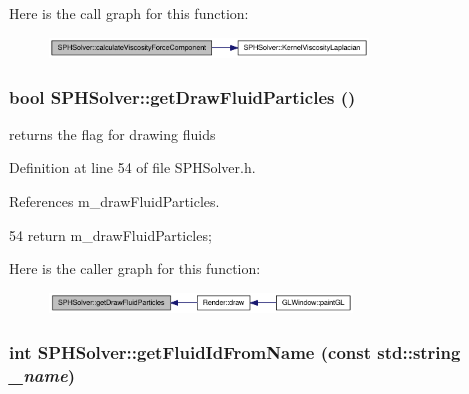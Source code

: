 Here is the call graph for this function:\nopagebreak
\begin{figure}[H]
\begin{center}
\leavevmode
\includegraphics[width=240pt]{class_s_p_h_solver_a5913e7c1cd5a66c51eb03762025c0782_cgraph}
\end{center}
\end{figure}


\hypertarget{class_s_p_h_solver_a4a224b16ea8c301048fb88cdbd0ac505}{
\subsubsection[{getDrawFluidParticles}]{\setlength{\rightskip}{0pt plus 5cm}bool SPHSolver::getDrawFluidParticles ()}}
\label{class_s_p_h_solver_a4a224b16ea8c301048fb88cdbd0ac505}


returns the flag for drawing fluids 



Definition at line 54 of file SPHSolver.h.



References m\_\-drawFluidParticles.




\begin{DoxyCode}
54 {return m_drawFluidParticles;}
\end{DoxyCode}




Here is the caller graph for this function:\nopagebreak
\begin{figure}[H]
\begin{center}
\leavevmode
\includegraphics[width=228pt]{class_s_p_h_solver_a4a224b16ea8c301048fb88cdbd0ac505_icgraph}
\end{center}
\end{figure}


\hypertarget{class_s_p_h_solver_acfa822e4291299eb6e6875347515572c}{
\subsubsection[{getFluidIdFromName}]{\setlength{\rightskip}{0pt plus 5cm}int SPHSolver::getFluidIdFromName (const std::string {\em \_\-name})}}
\label{class_s_p_h_solver_acfa822e4291299eb6e6875347515572c}


